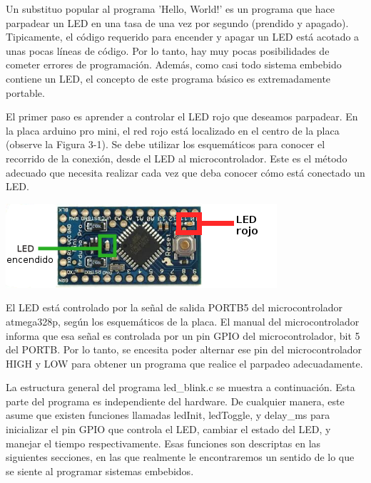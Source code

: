 \documentclass[12pt]{article}
\begin{document}
Un substituo popular al programa 'Hello, World!' es un programa que
hace parpadear un LED en una tasa de una vez por segundo (prendido y apagado).
Tipicamente, el código requerido para encender y apagar un LED está
acotado a unas pocas líneas de código. Por lo tanto, hay muy pocas posibilidades
de cometer errores de programación. Además, como casi todo sistema
embebido contiene un LED, el concepto de este programa básico es extremadamente
portable.


El primer paso es aprender a controlar el LED rojo que deseamos parpadear.
En la placa arduino pro mini, el red rojo está localizado en el centro 
de la placa (observe la Figura 3-1). Se debe utilizar los esquemáticos
para conocer el recorrido de la conexión, desde el LED al microcontrolador.
Este es el método adecuado que necesita realizar cada vez que deba
conocer cómo está conectado un LED.

\begin{center}
\includegraphics{led.png}
\end{center}

El LED está controlado por la señal de salida PORTB5 del microcontrolador
atmega328p, según los esquemáticos de la placa.
El manual del microcontrolador informa que esa señal es controlada por
un pin GPIO del microcontrolador, bit 5 del PORTB. Por lo tanto,
se encesita poder alternar ese pin del microcontrolador HIGH y LOW
para obtener un programa que realice el parpadeo adecuadamente.

La estructura general del programa led\_blink.c se muestra a continuación.
Esta parte del programa es independiente del hardware. De cualquier manera,
este asume que existen funciones llamadas ledInit, ledToggle, y delay\_ms
para inicializar el pin GPIO que controla el LED, cambiar el estado del LED,
y manejar el tiempo respectivamente. Esas funciones son descriptas en las 
siguientes secciones, en las que realmente le encontraremos un
sentido de lo que se siente al programar sistemas embebidos.
\end{document}
